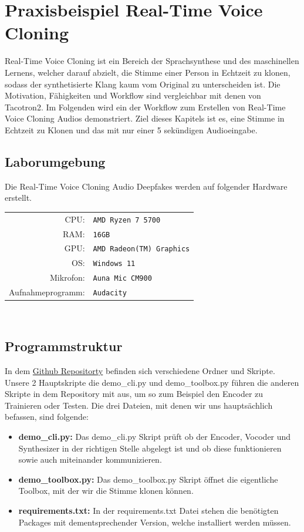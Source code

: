 \section{Praxisbeispiel Real-Time Voice Cloning}
Real-Time Voice Cloning ist ein Bereich der Sprachsynthese und des maschinellen Lernens, welcher darauf abzielt, die Stimme einer Person in Echtzeit zu klonen, sodass der synthetisierte Klang kaum vom Original zu unterscheiden ist.\newline
Die Motivation, Fähigkeiten und Workflow sind vergleichbar mit denen von Tacotron2.\newline
Im Folgenden wird ein der Workflow zum Erstellen von Real-Time Voice Cloning Audios demonstriert. Ziel dieses Kapitels ist es, eine Stimme in Echtzeit zu Klonen und das mit nur einer 5 sekündigen Audioeingabe.
\subsection{Laborumgebung}
Die Real-Time Voice Cloning Audio Deepfakes werden auf folgender Hardware erstellt.\\[0.5cm]
\begin{tabular}{rl}
    CPU:& \texttt{AMD Ryzen 7 5700}\\
    RAM:& \texttt{16GB}\\
    GPU:& \texttt{AMD Radeon(TM) Graphics}\\
    OS:& \texttt{Windows 11}\\
    Mikrofon:& \texttt{Auna Mic CM900}\\
    Aufnahmeprogramm:& \texttt{Audacity}
\end{tabular}\\[0.5cm]
\subsection{Programmstruktur}
In dem \href{https://github.com/CorentinJ/Real-Time-Voice-Cloning}{Github Repositorty} befinden sich verschiedene Ordner und Skripte. Unsere 2 Hauptskripte die demo\_cli.py und demo\_toolbox.py führen die anderen Skripte in dem Repository mit aus, um so zum Beispiel den Encoder zu Trainieren oder Testen.
Die drei Dateien, mit denen wir uns hauptsächlich befassen, sind folgende:
\begin{itemize}
    \item \textbf{demo\_cli.py:} Das demo\_cli.py Skript prüft ob der Encoder, Vocoder und Synthesizer in der richtigen Stelle abgelegt ist und ob diese funktionieren sowie auch miteinander kommunizieren.
    \item \textbf{demo\_toolbox.py:} Das demo\_toolbox.py Skript öffnet die eigentliche Toolbox, mit der wir die Stimme klonen können.
    \item \textbf{requirements.txt:} In der requirements.txt Datei stehen die benötigten Packages mit dementsprechender Version, welche installiert werden müssen.
\end{itemize}

